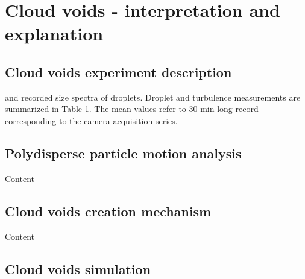 \documentclass[../main.tex]{subfiles}
\begin{document}
\chapter{Cloud voids - interpretation and explanation} %

\label{ch:holes} %


\section{Cloud voids experiment description}

 and recorded size spectra of droplets. Droplet and turbulence measurements are
summarized in Table 1. The mean values refer to 30 min long
record corresponding to the camera acquisition series.


\section{Polydisperse particle motion analysis}

Content
\section{Cloud voids creation mechanism}
Content
\section{Cloud voids simulation}

\end{document}
